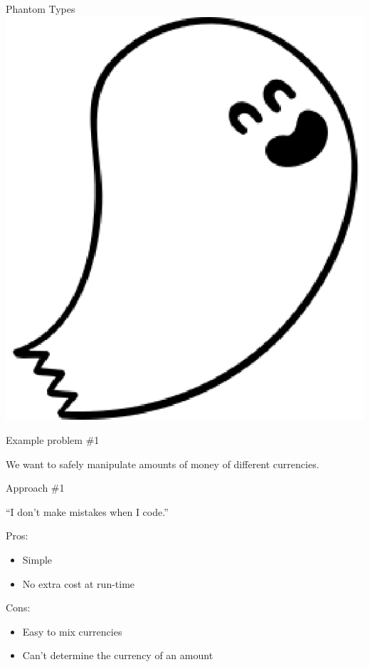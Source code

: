 \documentclass[11pt]{beamer}
\renewcommand\big[1]{
  \begin{center}
    \Large{#1}
  \end{center}
}
\begin{document}
\begin{frame}
  \begin{center}
    \Huge{Phantom Types}
    \vskip1cm
    \includegraphics[scale=0.5]{phantom.eps}
  \end{center}
\end{frame}

\begin{frame}
  \big{Example problem \#1}

  \begin{center}
    We want to safely manipulate amounts of money of different currencies.
  \end{center}
\end{frame}

\begin{frame}
  \big{Approach \#1}
  \centering``I don't make mistakes when I code.''
  \pause
  \vskip1cm
  \begin{minipage}[t]{.48\textwidth}
    Pros:
    \footnotesize
    \begin{itemize}
      \item Simple
      \item No extra cost at run-time
    \end{itemize}
  \end{minipage}
  \begin{minipage}[t]{.48\textwidth}
    Cons:
    \footnotesize
    \begin{itemize}
      \item Easy to mix currencies
      \item Can't determine the currency of an amount
    \end{itemize}
  \end{minipage}
\end{frame}
\end{document}
